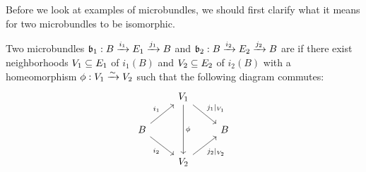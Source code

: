 \begin{myparagraph}
    Before we look at examples of microbundles, we should first clarify
    what it means for two microbundles to be isomorphic.
\end{myparagraph}

\begin{mydefinition}[isomorphy]
    Two microbundles $\bundledef{\bb_1}{B}{E_1}{i_1}{j_1}$ and $\bundledef{\bb_2}{B}{E_2}{i_2}{j_2}$ are  if
    there exist neighborhoods $V_1 \sub E_1$ of $i_1(B)$ and $V_2 \sub E_2$ of $i_2(B)$ with
    a homeomorphism $\phi: V_1 \isomto V_2$ such that the following diagram commutes: 
    \[
        \begin{tikzcd}
            & V_1 \ar[dr, "j_1\vert_{V_1}"] \ar[dd, "\phi"] & \\
            B \ar[ur, "i_1"] \ar[dr, "i_2"'] & & B \\
            & V_2 \ar[ur, "j_2\vert_{V_2}"'] &
        \end{tikzcd}
    \]
\end{mydefinition}